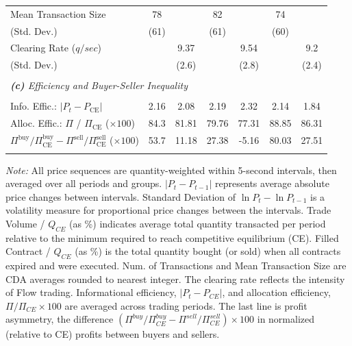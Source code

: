 \begin{table}
\begin{threeparttable}
\begin{tabular}{lcccccc}
     Mean Transaction Size                      & 78        &           & 82        &           & 74        &           \\
     \hspace{3mm}(Std. Dev.)             & (61)      &           & (61)      &           & (60)      &           \\
     Clearing Rate ($q/sec$)                 &           & 9.37      &           & 9.54      &           & 9.2       \\
     \hspace{3mm}(Std. Dev.)             &           & (2.6)     &           & (2.8)     &           & (2.4)     \\
     \\ [-1.8ex]
     \multicolumn{7}{l}{\textit{\textbf{(c)} Efficiency and Buyer-Seller Inequality}} \\
     \\ [-1.8ex]
     Info. Effic.: $\lvert P_t - P_{\text{CE}} \rvert $        & 2.16      & 2.08      & 2.19      & 2.32      & 2.14      & 1.84      \\     
     Alloc. Effic.: $\Pi$ / $\Pi_{\text{CE}}$ ($\times 100$)          & 84.3      & 81.81     & 79.76     & 77.31     & 88.85     & 86.31     \\
     
     ${\Pi^{\text{buy}}}/{\Pi^{\text{buy}}_{\text{CE}}} - {\Pi^{\text{sell}}}/{\Pi^{\text{sell}}_{\text{CE}}}$ 
     ($\times 100$) & 53.7      & 11.18     & 27.38     & -5.16     & 80.03     & 27.51     \\
     \\[-1.8ex] 
    \bottomrule 
    \end{tabular}
    \begin{tablenotes}
      \footnotesize
\textit{Note:} All price sequences are quantity-weighted within 5-second intervals, then averaged over all periods and groups. \( |P_{t} - P_{t-1}| \) represents average absolute price changes between intervals. Standard Deviation of \( \ln P_{t} - \ln P_{t-1} \) is a volatility measure for proportional price changes between the intervals. Trade Volume / $Q_{CE}$ (as \%) indicates average total quantity transacted per period relative to the minimum required to reach competitive equilibrium (CE). Filled Contract / $Q_{CE}$ (as \%) is the total quantity bought (or sold) when all contracts expired and were executed. 
Num. of Transactions and Mean Transaction Size are CDA averages rounded to nearest integer. 
The clearing rate reflects the intensity of Flow trading. 
Informational efficiency, \( |P_{t} - P_{CE}| \), and allocation efficiency, \( \Pi/\Pi_{CE} \times 100 \)
are averaged across trading periods.
The last line is profit asymmetry, the difference \( (\Pi^{buy}/\Pi^{buy}_{CE} - \Pi^{sell}/\Pi^{sell}_{CE}) \times 100 \) in normalized (relative to CE) profits between buyers and sellers. 
    \end{tablenotes}
    \end{threeparttable}
    \label{tab:summary_stat}
\end{table}

